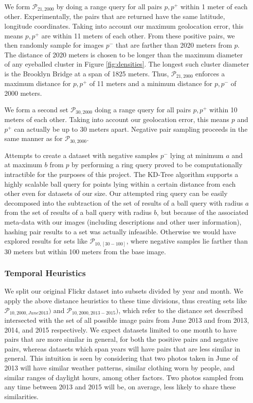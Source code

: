 We form $\mathcal{P}_{21, 2000}$ by doing a range query for all pairs $p, p^+$ within 1 meter of each other. Experimentally, the pairs that are returned have the same latitude, longitude coordinates. Taking into account our maximum geolocation error, this means $p, p^+$ are within 11 meters of each other. From these positive pairs, we then randomly sample for images $p^-$ that are farther than 2020 meters from $p$. The distance of 2020 meters is chosen to be longer than the maximum diameter of any eyeballed cluster in Figure \ref{fig:densities}. The longest such cluster diameter is the Brooklyn Bridge at a span of 1825 meters. Thus, $\mathcal{P}_{21,2000}$ enforces a maximum distance for $p, p^+$ of 11 meters and a minimum distance for $p, p^-$ of 2000 meters.

We form a second set $\mathcal{P}_{30,2000}$ doing a range query for all pairs $p, p^+$ within 10 meters of each other. Taking into account our geolocation error, this means $p$ and $p^+$ can actually be up to 30 meters apart. Negative pair sampling proceeds in the same manner as for $\mathcal{P}_{30,2000}$. 

Attempts to create a dataset with negative samples $p^-$ lying at minimum $a$ and at maximum $b$ from $p$ by performing a ring query proved to be computationally intractible for the purposes of this project. The KD-Tree algorithm supports a highly scalable ball query for points lying within a certain distance from each other even for datasets of our size. Our attempted ring query can be easily decomposed into the subtraction of the set of results of a ball query with radius $a$ from the set of results of a ball query with radius $b$, but because of the associated meta-data with our images (including descriptions and other user information), hashing pair results to a set was actually infeasible. Otherwise we would have explored results for sets like $\mathcal{P}_{10,[30-100]}$, where negative samples lie farther than 30 meters but within 100 meters from the base image.

\subsubsection{Temporal Heuristics}
We split our original Flickr dataset into subsets divided by year and month. We apply the above distance heuristics to these time divisions, thus creating sets like $\mathcal{P}_{10,2000,June2013})$ and $\mathcal{P}_{10,2000,2013-2015})$, which refer to the distance set described intersected with the set of all possible image pairs from June 2013 and from 2013, 2014, and 2015 respectively. We expect datasets limited to one month to have pairs that are more similar in general, for both the positive pairs and negative pairs, whereas datasets which span years will have pairs that are less similar in general. This intuition is seen by considering that two photos taken in June of 2013 will have similar weather patterns, similar clothing worn by people, and similar ranges of daylight hours, among other factors. Two photos sampled from any time between 2013 and 2015 will be, on average, less likely to share these similarities. 

